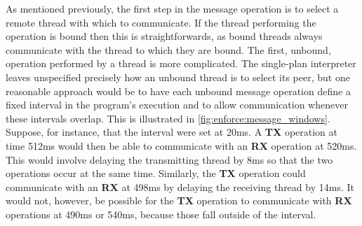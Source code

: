 As mentioned previously, the first step in the message operation is to
select a remote thread with which to communicate.  If the thread
performing the operation is bound then this is straightforwards, as
bound threads always communicate with the thread to which they are
bound.  The first, unbound, operation performed by a thread is more
complicated.  The single-plan interpreter leaves unspecified precisely
how an unbound thread is to select its peer, but one reasonable
approach would be to have each unbound message operation define a
fixed interval in the program's execution and to allow communication
whenever these intervals overlap.  This is illustrated in
\autoref{fig:enforce:message_windows}.  Suppose, for instance, that
the interval were set at 20ms.  A \textbf{TX} operation at time 512ms
would then be able to communicate with an \textbf{RX} operation at
520ms.  This would involve delaying the transmitting thread by 8ms so
that the two operations occur at the same time.  Similarly, the
\textbf{TX} operation could communicate with an \textbf{RX} at 498ms
by delaying the receiving thread by 14ms.  It would not, however, be
possible for the \textbf{TX} operation to communicate with \textbf{RX}
operations at 490ms or 540ms, because those fall outside of the
interval.

